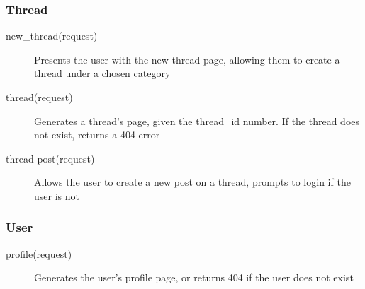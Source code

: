 \documentclass[12pt]{scrartcl}
\begin{document}
\subsubsection{Thread}
\begin{description}
\item [new\_thread(request)] Presents the user with the new thread page, allowing them to create a thread under a chosen category
\item [thread(request)] Generates a thread’s page, given the thread\_id number. If the thread does not exist, returns a 404 error
\item [thread post(request)] Allows the user to create a new post on a thread, prompts to login if the user is not
\end{description}

\subsubsection{User}
\begin{description}
\item [profile(request)] Generates the user’s profile page, or returns 404 if the user does not exist
\end{description}
\end{document}
